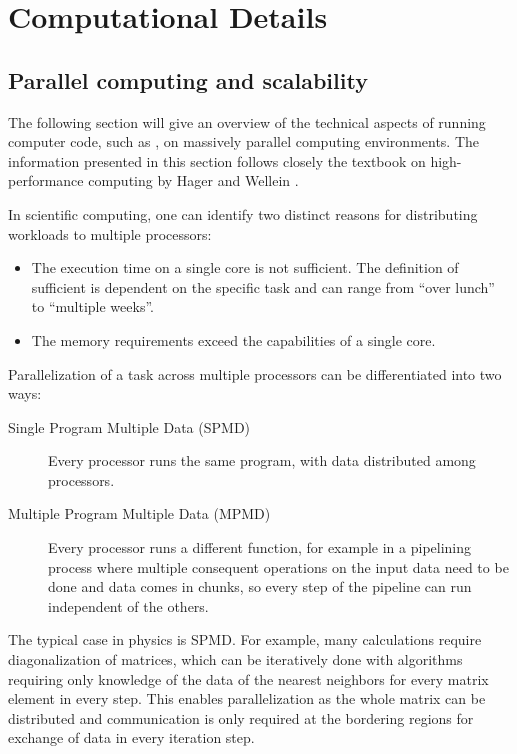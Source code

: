 \documentclass[main.tex]{subfiles}
\begin{document}
\chapter{Computational Details\label{ch:computation}}

\section{Parallel computing and scalability\label{sec:parallel_computing}}

The following section will give an overview of the technical aspects of running computer code, such as \QE, on massively parallel computing environments.
The information presented in this section follows closely the textbook on high-performance computing by Hager and Wellein \cite{hager_introduction_2010}.

In scientific computing, one can identify two distinct reasons for distributing workloads to multiple processors:
\begin{itemize}
    \item The execution time on a single core is not sufficient. The definition of sufficient is dependent on the specific task and can range from \enquote{over lunch} to \enquote{multiple weeks}.
    \item The memory requirements exceed the capabilities of a single core.
\end{itemize}

Parallelization of a task across multiple processors can be differentiated into two ways:
\begin{description}
    \item[Single Program Multiple Data (SPMD)] Every processor runs the same program, with data distributed among processors.
    \item[Multiple Program Multiple Data (MPMD)] Every processor runs a different function, for example in a pipelining process where multiple consequent operations on the input data need to be done and data comes in chunks, so every step of the pipeline can run independent of the others.
\end{description}
The typical case in physics is SPMD.
For example, many calculations require diagonalization of matrices, which can be iteratively done with algorithms requiring only knowledge of the data of the nearest neighbors for every matrix element in every step.
This enables parallelization as the whole matrix can be distributed and communication is only required at the bordering regions for exchange of data in every iteration step.
\end{document}
